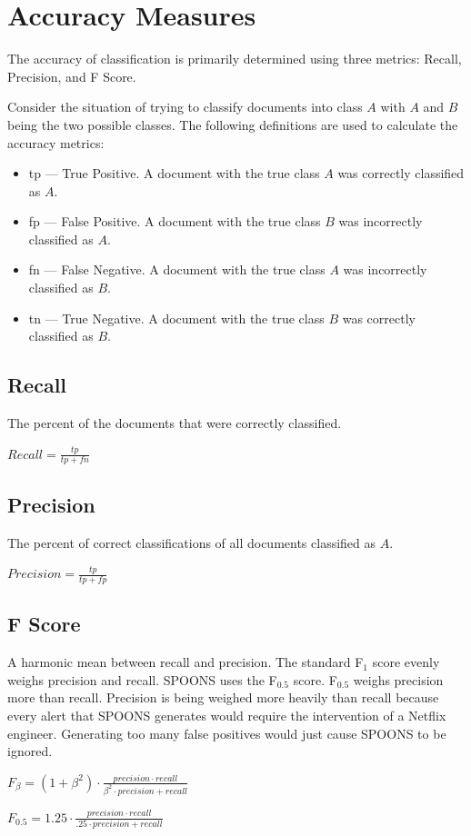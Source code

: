 \documentclass[12pt]{ucthesis}
\begin{document}
\section{Accuracy Measures}
\label{background-accuracy}
The accuracy of classification is primarily determined using three metrics: Recall, Precision, and F Score.

Consider the situation of trying to classify documents into class $A$ with $A$ and $B$ being the two possible classes.
The following definitions are used to calculate the accuracy metrics:
\begin{itemize}
   \item tp --- True Positive. A document with the true class $A$ was correctly classified as $A$.
   \item fp --- False Positive. A document with the true class $B$ was incorrectly classified as $A$.
   \item fn --- False Negative. A document with the true class $A$ was incorrectly classified as $B$.
   \item tn --- True Negative. A document with the true class $B$ was correctly classified as $B$.
\end{itemize}

\subsection{Recall}
\label{background-accuracy-recall}
The percent of the documents that were correctly classified.
\begin{center}
   $Recall = \frac{tp}{tp + fn}$
\end{center}

\subsection{Precision}
\label{background-accuracy-precision}
The percent of correct classifications of all documents classified as $A$.
\begin{center}
   $Precision = \frac{tp}{tp + fp}$
\end{center}

\subsection{F Score}
\label{background-accuracy-f}
A harmonic mean between recall and precision. The standard F$_{1}$ score evenly weighs precision and recall.
SPOONS uses the F$_{0.5}$ score. F$_{0.5}$ weighs precision more than recall. Precision is being weighed more heavily than recall because
every alert that SPOONS generates would require the intervention of a Netflix engineer. Generating too many
false positives would just cause SPOONS to be ignored.
\begin{center}
   $F_{\beta} = (1 + \beta^{2}) \cdot \frac{precision \cdot recall}{\beta^{2} \cdot precision + recall}$
\end{center}
\begin{center}
   $F_{0.5} = 1.25 \cdot \frac{precision \cdot recall}{.25 \cdot precision + recall}$
\end{center}
\end{document}
